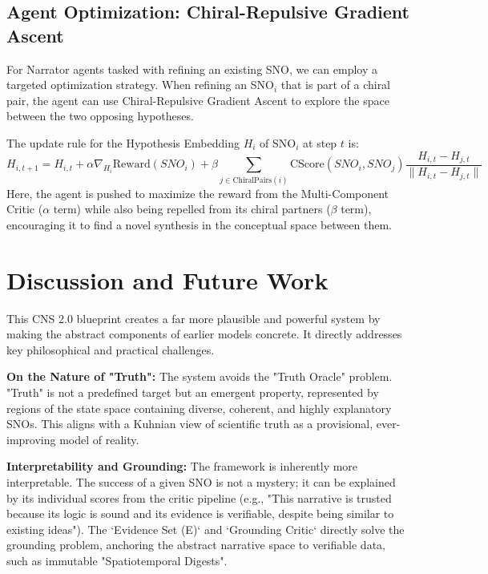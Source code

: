 \documentclass[12pt, a4paper]{article}
\begin{document}
\subsection{Agent Optimization: Chiral-Repulsive Gradient Ascent}
For Narrator agents tasked with refining an existing SNO, we can employ a targeted optimization strategy. When refining an SNO$_i$ that is part of a chiral pair, the agent can use Chiral-Repulsive Gradient Ascent to explore the space between the two opposing hypotheses.

The update rule for the Hypothesis Embedding $H_i$ of SNO$_i$ at step $t$ is:
\begin{equation} \label{eq:crga}
H_{i, t+1} = H_{i, t} + \alpha \nabla_{H_i} \text{Reward}(SNO_i) + \beta \sum_{j \in \text{ChiralPairs}(i)} \text{CScore}(SNO_i, SNO_j) \frac{H_{i, t} - H_{j, t}}{\|H_{i, t} - H_{j, t}\|}
\end{equation}
Here, the agent is pushed to maximize the reward from the Multi-Component Critic ($\alpha$ term) while also being repelled from its chiral partners ($\beta$ term), encouraging it to find a novel synthesis in the conceptual space between them.

\section{Discussion and Future Work}
This CNS 2.0 blueprint creates a far more plausible and powerful system by making the abstract components of earlier models concrete. It directly addresses key philosophical and practical challenges.

\textbf{On the Nature of "Truth":} The system avoids the "Truth Oracle" problem. "Truth" is not a predefined target but an emergent property, represented by regions of the state space containing diverse, coherent, and highly explanatory SNOs. This aligns with a Kuhnian view of scientific truth as a provisional, ever-improving model of reality.

\textbf{Interpretability and Grounding:} The framework is inherently more interpretable. The success of a given SNO is not a mystery; it can be explained by its individual scores from the critic pipeline (e.g., "This narrative is trusted because its logic is sound and its evidence is verifiable, despite being similar to existing ideas"). The `Evidence Set (E)` and `Grounding Critic` directly solve the grounding problem, anchoring the abstract narrative space to verifiable data, such as immutable "Spatiotemporal Digests".
\end{document}

